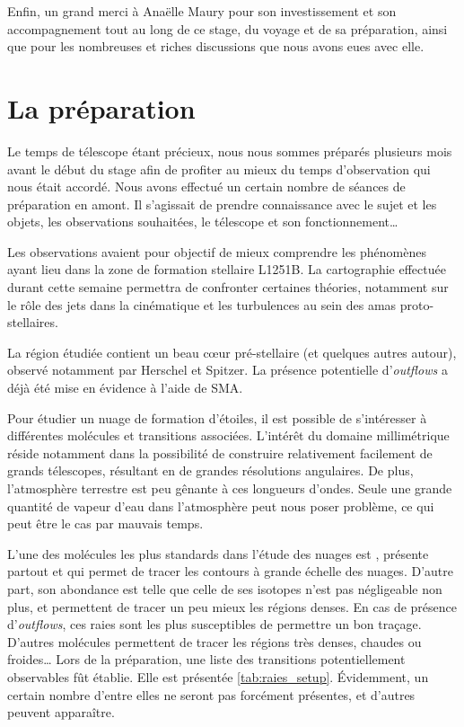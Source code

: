 \documentclass[a4paper,10pt,french]{article}
\begin{document}
Enfin, un grand merci à Anaëlle Maury pour son investissement et son
accompagnement tout au long de ce stage, du voyage et de sa préparation, ainsi
que pour les nombreuses et riches discussions que nous avons eues avec elle.

\tableofcontents

\newpage

\setlength{\parindent}{16pt}
\setlength{\parskip}{1ex}

\section{La préparation}

Le temps de télescope étant précieux, nous nous sommes préparés plusieurs mois
avant le début du stage afin de profiter au mieux du temps d’observation qui
nous était accordé. Nous avons effectué un certain nombre de séances de
préparation en amont. Il s’agissait de prendre connaissance avec le sujet et
les objets, les observations souhaitées, le télescope et son fonctionnement…

Les observations avaient pour objectif de mieux comprendre les phénomènes ayant
lieu dans la zone de formation stellaire L1251B. La cartographie effectuée
durant cette semaine permettra de confronter certaines théories, notamment sur
le rôle des jets dans la cinématique et les turbulences au sein des amas
proto-stellaires.

La région étudiée contient un beau cœur pré-stellaire (et quelques autres
autour), observé notamment par Herschel et Spitzer. La présence potentielle
d’\textit{outflows} a déjà été mise en évidence à l’aide de SMA.

Pour étudier un nuage de formation d’étoiles, il est possible de s’intéresser à
différentes molécules et transitions associées. L’intérêt du domaine
millimétrique réside notamment dans la possibilité de construire relativement
facilement de grands télescopes, résultant en de grandes résolutions
angulaires. De plus, l’atmosphère terrestre est peu gênante à ces longueurs
d’ondes. Seule une grande quantité de vapeur d’eau dans l’atmosphère peut nous
poser problème, ce qui peut être le cas par mauvais temps.

L’une des molécules les plus standards dans l’étude des nuages est ,
présente partout et qui permet de tracer les contours à grande échelle des
nuages. D’autre part, son abondance est telle que celle de ses isotopes n’est
pas négligeable non plus,  et  permettent de tracer un peu
mieux les régions denses. En cas de présence d’\textit{outflows}, ces raies
sont les plus susceptibles de permettre un bon traçage. D’autres molécules
permettent de tracer les régions très denses, chaudes ou froides… Lors de la
préparation, une liste des transitions potentiellement observables fût établie.
Elle est présentée \cref{tab:raies_setup}. Évidemment, un certain nombre
d’entre elles ne seront pas forcément présentes, et d’autres peuvent
apparaître.
\end{document}
